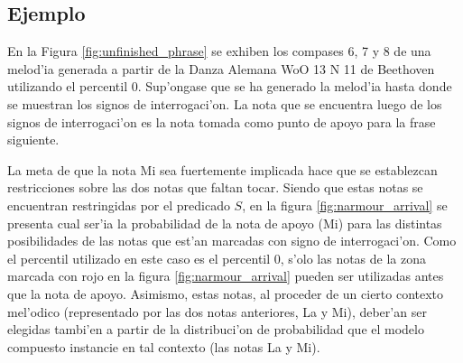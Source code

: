 \subsection{Ejemplo}
En la Figura \ref{fig:unfinished_phrase} se exhiben los compases 6, 7 y 8 de una melod'ia generada a partir de la Danza Alemana WoO 13 N 11 
de Beethoven utilizando el percentil 0. Sup'ongase que se ha generado la melod'ia hasta donde se muestran los signos de interrogaci'on. 
La nota que se encuentra luego de los signos de interrogaci'on es la nota tomada como punto de apoyo para la frase siguiente.

\begin{imagen}
    \width{5cm}
\end{imagen}

La meta de que la nota Mi sea fuertemente implicada hace que se establezcan restricciones sobre las dos notas que faltan tocar. 
Siendo que estas notas se encuentran restringidas por el predicado $S$, en la figura \ref{fig:narmour_arrival} se presenta cual ser'ia 
la probabilidad de la nota de apoyo (Mi) para las distintas posibilidades de las notas que est'an marcadas con signo de interrogaci'on. 
Como el percentil utilizado en este caso es el percentil 0, s'olo las notas de la zona marcada con rojo en la figura \ref{fig:narmour_arrival}
pueden ser utilizadas antes que la nota de apoyo. Asimismo, estas notas, al proceder de un cierto contexto mel'odico 
(representado por las dos notas anteriores, La y Mi), deber'an ser elegidas tambi'en a partir de la distribuci'on de probabilidad 
que el modelo compuesto instancie en tal contexto (las notas La y Mi). 

\begin{imagen}
    \width{13cm}
\end{imagen}

\begin{imagen}
    \width{13cm}
\end{imagen}

